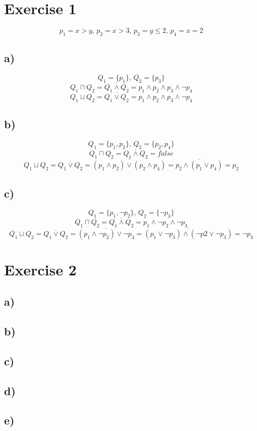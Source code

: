 \documentclass[fleqn,12pt]{article}
\begin{document}
\section*{Exercise 1}
$$p_1 = x>y \text{, }p_2 = x>3 \text{, }p_3 = y \leq 2 \text{, } p_4 = x = 2$$
\subsection*{a)}
$$Q_1 = \{p_1\}\text{, } Q_2 =  \{p_3\}$$
$$Q_1 \sqcap Q_2 = \overline{Q_1 \wedge Q_2} = p_1 \wedge p_2 \wedge p_3 \wedge \lnot p_4$$
$$Q_1 \sqcup Q_2 = \overline{Q_1 \vee Q_2} = p_1 \wedge p_2 \wedge p_3 \wedge \lnot p_4$$
\subsection*{b)}
$$Q_1 = \{p_1,p_2\}\text{, } Q_2 =  \{p_2,p_4\}$$
$$Q_1 \sqcap Q_2 = \overline{Q_1 \wedge Q_2} = false$$
$$Q_1 \sqcup Q_2 = \overline{Q_1 \vee Q_2} = \overline{(p_1 \wedge p_2) \vee (p_2 \wedge p_4)} = \overline{p_2 \wedge (p_1 \vee p_4)} = p_2$$
\subsection*{c)}
$$Q_1 = \{p_1,\lnot p_2\}\text{, } Q_2 =  \{\lnot p_3\}$$
$$Q_1 \sqcap Q_2 = \overline{Q_1 \wedge Q_2} = p_1 \wedge \lnot p_2 \wedge \lnot p_3$$
$$Q_1 \sqcup Q_2 = \overline{Q_1 \vee Q_2} = \overline{(p_1 \wedge \lnot p_2) \vee \lnot p_3} = \overline{(p_1 \vee \lnot p_3) \wedge (\lnot p2 \vee \lnot p_3)} = \lnot p_3$$
\section*{Exercise 2}

\subsection*{a)}
\subsection*{b)}
\subsection*{c)}
\subsection*{d)}
\subsection*{e)}
\end{document}
